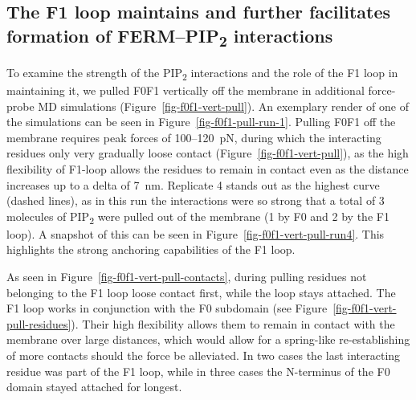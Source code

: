 \documentclass[
  twocolumn]{biophys-new-mod}
\begin{document}
\hypertarget{the-f1-loop-maintains-and-further-facilitates-formation-of-fermpip2-interactions}{%
\subsection{\texorpdfstring{The F1 loop maintains and further
facilitates formation of FERM--PIP\textsubscript{2}
interactions}{The F1 loop maintains and further facilitates formation of FERM--PIP2 interactions}}\label{the-f1-loop-maintains-and-further-facilitates-formation-of-fermpip2-interactions}}

To examine the strength of the PIP\textsubscript{2} interactions and the
role of the F1 loop in maintaining it, we pulled F0F1 vertically off the
membrane in additional force-probe MD simulations
(Figure~\ref{fig-f0f1-vert-pull}). An exemplary render of one of the
simulations can be seen in Figure~\ref{fig-f0f1-pull-run-1}. Pulling
F0F1 off the membrane requires peak forces of 100--120~pN, during which
the interacting residues only very gradually loose contact
(Figure~\ref{fig-f0f1-vert-pull}), as the high flexibility of F1-loop
allows the residues to remain in contact even as the distance increases
up to a delta of 7~nm. Replicate 4 stands out as the highest curve
(dashed lines), as in this run the interactions were so strong that a
total of 3 molecules of PIP\textsubscript{2} were pulled out of the
membrane (1 by F0 and 2 by the F1 loop). A snapshot of this can be seen
in Figure~\ref{fig-f0f1-vert-pull-run4}. This highlights the strong
anchoring capabilities of the F1 loop.

As seen in Figure~\ref{fig-f0f1-vert-pull-contacts}, during pulling
residues not belonging to the F1 loop loose contact first, while the
loop stays attached. The F1 loop works in conjunction with the F0
subdomain (see Figure~\ref{fig-f0f1-vert-pull-residues}). Their high
flexibility allows them to remain in contact with the membrane over
large distances, which would allow for a spring-like re-establishing of
more contacts should the force be alleviated. In two cases the last
interacting residue was part of the F1 loop, while in three cases the
N-terminus of the F0 domain stayed attached for longest.
\end{document}
